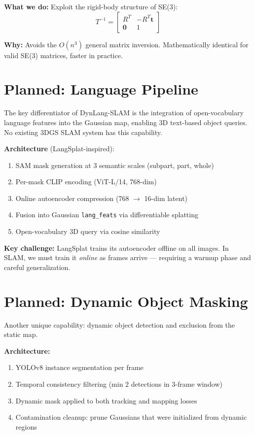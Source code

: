\documentclass[10pt,twocolumn]{article}
\begin{document}
\textbf{What we do:} Exploit the rigid-body structure of SE(3):
\begin{equation}
T^{-1} = \begin{bmatrix} R^T & -R^T \mathbf{t} \\ \mathbf{0} & 1 \end{bmatrix}
\end{equation}

\textbf{Why:} Avoids the $O(n^3)$ general matrix inversion. Mathematically identical for valid SE(3) matrices, faster in practice.

\section{Planned: Language Pipeline}
\label{sec:language}

The key differentiator of DynLang-SLAM is the integration of open-vocabulary language features into the Gaussian map, enabling 3D text-based object queries. No existing 3DGS SLAM system has this capability.

\textbf{Architecture} (LangSplat-inspired):
\begin{enumerate}[itemsep=2pt]
\item SAM mask generation at 3 semantic scales (subpart, part, whole)
\item Per-mask CLIP encoding (ViT-L/14, 768-dim)
\item Online autoencoder compression (768 $\rightarrow$ 16-dim latent)
\item Fusion into Gaussian \texttt{lang\_feats} via differentiable splatting
\item Open-vocabulary 3D query via cosine similarity
\end{enumerate}

\textbf{Key challenge:} LangSplat trains its autoencoder offline on all images. In SLAM, we must train it \textit{online} as frames arrive --- requiring a warmup phase and careful generalization.

\section{Planned: Dynamic Object Masking}

Another unique capability: dynamic object detection and exclusion from the static map.

\textbf{Architecture:}
\begin{enumerate}[itemsep=2pt]
\item YOLOv8 instance segmentation per frame
\item Temporal consistency filtering (min 2 detections in 3-frame window)
\item Dynamic mask applied to both tracking and mapping losses
\item Contamination cleanup: prune Gaussians that were initialized from dynamic regions
\end{enumerate}
\end{document}
